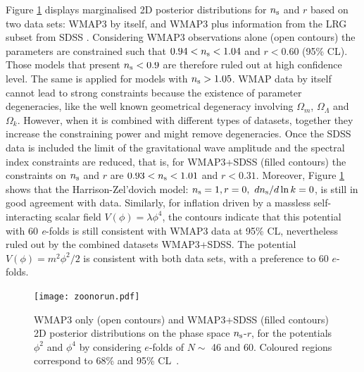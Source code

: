 \documentclass{rmaa}
\begin{document}
Figure \ref{fig:Kinney} displays marginalised 2D posterior distributions for $n_{\rm s}$ and $r$ based on
two data sets: WMAP3 by itself, and WMAP3 plus information from the 
LRG subset from SDSS \citep{Kinney}. Considering WMAP3 observations alone (open contours)
the parameters are constrained such that $0.94 < n_{\rm s} < 1.04$
and $r<0.60$ (95\% CL). Those models that present  $n_{\rm s}<0.9$ are  therefore ruled out at
high confidence level. The same is applied for models with $n_{\rm s} > 1.05$. 
%
WMAP data by itself  cannot lead to strong constraints because the existence of parameter 
degeneracies, like the well known geometrical degeneracy involving $\Omega_m$, 
$\Omega_{\Lambda}$ and $\Omega_k$. However, when it is combined with different types 
of datasets, together they increase the constraining power and might remove degeneracies. 
Once the SDSS data is included the limit of the gravitational wave amplitude 
and the spectral index constraints are  reduced, that is, %
for WMAP3+SDSS (filled contours) the constraints on $n_{\rm s}$ and $r$ are $0.93<n_{\rm s}<1.01$ and
$r<0.31$. 
Moreover, Figure \ref{fig:Kinney} shows that 
the Harrison-Zel'dovich model: $n_{\rm s}=1, r=0, ~dn_{\rm s}/d \ln k=0$,
is still in  good agreement with data.
Similarly, for inflation driven by a massless self-interacting scalar field
$V(\phi) = \lambda\phi^4$,  the contours indicate that this potential
with 60 \textit{e}-folds is still consistent with WMAP3 data at 95\% CL,
nevertheless ruled out by the combined datasets WMAP3+SDSS.
The potential $V(\phi) = m^2\phi^2/2$ is consistent with both data sets, with a preference to 60 $e$-folds.
\\

\begin{figure}[h!]
\begin{center}
  \texttt{[image: zoonorun.pdf]} 
\caption{ %
WMAP3 only (open contours) and 
WMAP3+SDSS (filled contours) 2D posterior distributions on the phase space $n_{\rm s}$-$r$,
for the potentials $\phi^2$ and $\phi^4$ by considering  $e$-folds of $N\sim$ 46 and 60.
Coloured regions correspond to 68\% and 95\% CL~\citep{Kinney}.
}
\label{fig:Kinney}
\end{center}
\end{figure}
\end{document}
